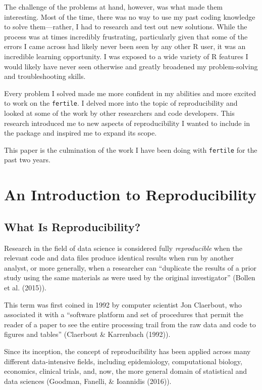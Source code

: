 \documentclass[12pt,twoside]{reedthesis}
\begin{document}
The challenge of the problems at hand, however, was what made them interesting. Most of the time, there was no way to use my past coding knowledge to solve them---rather, I had to research and test out new solutions. While the process was at times incredibly frustrating, particularly given that some of the errors I came across had likely never been seen by any other R user, it was an incredible learning opportunity. I was exposed to a wide variety of R features I would likely have never seen otherwise and greatly broadened my problem-solving and troubleshooting skills.

Every problem I solved made me more confident in my abilities and more excited to work on the \texttt{fertile}. I delved more into the topic of reproducibility and looked at some of the work by other researchers and code developers. This research introduced me to new aspects of reproducibility I wanted to include in the package and inspired me to expand its scope.

This paper is the culmination of the work I have been doing with \texttt{fertile} for the past two years.

\hypertarget{reproducibility}{%
\chapter{An Introduction to Reproducibility}\label{reproducibility}}

\hypertarget{what-is-reproducibility}{%
\section{What Is Reproducibility?}\label{what-is-reproducibility}}

Research in the field of data science is considered fully \emph{reproducible} when the relevant code and data files produce identical results when run by another analyst, or more generally, when a researcher can ``duplicate the results of a prior study using the same materials as were used by the original investigator'' (Bollen et al. (2015)).

This term was first coined in 1992 by computer scientist Jon Claerbout, who associated it with a ``software platform and set of procedures that permit the reader of a paper to see the entire processing trail from the raw data and code to figures and tables'' (Claerbout \& Karrenbach (1992)).

Since its inception, the concept of reproducibility has been applied across many different data-intensive fields, including epidemiology, computational biology, economics, clinical trials, and, now, the more general domain of statistical and data sciences (Goodman, Fanelli, \& Ioannidis (2016)).
\end{document}
